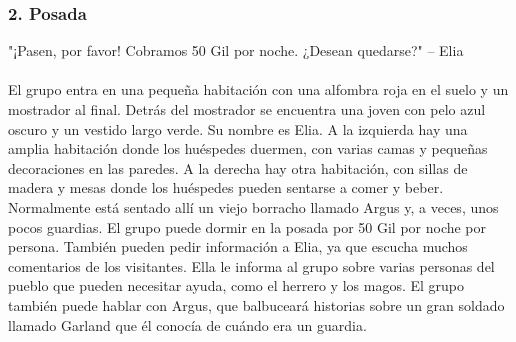 \subsubsection*{2. Posada}
"¡Pasen, por favor! Cobramos 50 Gil por noche. ¿Desean quedarse?" -- Elia \\\\
El grupo entra en una pequeña habitación con una alfombra roja en el suelo y un mostrador al final. Detrás del mostrador se encuentra una joven con pelo azul oscuro y un vestido largo verde. Su nombre es Elia. A la izquierda hay una amplia habitación donde los huéspedes duermen, con varias camas y pequeñas decoraciones en las paredes. A la derecha hay otra habitación, con sillas de madera y mesas donde los huéspedes pueden sentarse a comer y beber. Normalmente está sentado allí un viejo borracho llamado Argus y, a veces, unos pocos guardias. El grupo puede dormir en la posada por 50 Gil por noche por persona. También pueden pedir información a Elia, ya que escucha muchos comentarios de los visitantes. Ella le informa al grupo sobre varias personas del pueblo que pueden necesitar ayuda, como el herrero y los magos. El grupo también puede hablar con Argus, que balbuceará historias sobre un gran soldado llamado Garland que él conocía de cuándo era un guardia.

